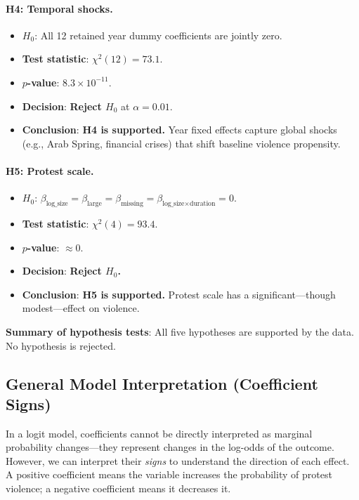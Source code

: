 \documentclass[12pt,a4paper]{article}
\begin{document}
\paragraph{H4: Temporal shocks.}
\begin{itemize}
  \item $H_0$: All 12 retained year dummy coefficients are jointly zero.
  \item \textbf{Test statistic}: $\chi^2(12) = 73.1$.
  \item \textbf{$p$-value}: $8.3 \times 10^{-11}$.
  \item \textbf{Decision}: \textbf{Reject $H_0$} at $\alpha = 0.01$.
  \item \textbf{Conclusion}: \textbf{H4 is supported.} Year fixed effects capture global shocks (e.g., Arab Spring, financial crises) that shift baseline violence propensity.
\end{itemize}

\paragraph{H5: Protest scale.}
\begin{itemize}
  \item $H_0$: $\beta_{\text{log\_size}} = \beta_{\text{large}} = \beta_{\text{missing}} = \beta_{\text{log\_size} \times \text{duration}} = 0$.
  \item \textbf{Test statistic}: $\chi^2(4) = 93.4$.
  \item \textbf{$p$-value}: $\approx 0$.
  \item \textbf{Decision}: \textbf{Reject $H_0$.}
  \item \textbf{Conclusion}: \textbf{H5 is supported.} Protest scale has a significant---though modest---effect on violence.
\end{itemize}

\textbf{Summary of hypothesis tests}: All five hypotheses are supported by the data. No hypothesis is rejected.

\subsection{General Model Interpretation (Coefficient Signs)}

In a logit model, coefficients cannot be directly interpreted as marginal probability changes---they represent changes in the log-odds of the outcome. However, we can interpret their \emph{signs} to understand the direction of each effect. A positive coefficient means the variable increases the probability of protest violence; a negative coefficient means it decreases it.
\end{document}
